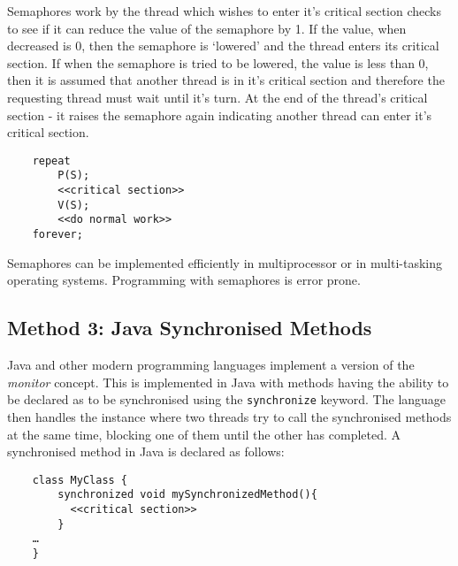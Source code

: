 Semaphores work by the thread which wishes to enter it's critical section checks to see if it can reduce the value of the semaphore by 1. If the value, when decreased is 0, then the semaphore is `lowered' and the thread enters its critical section. If when the semaphore is tried to be lowered, the value is less than 0, then it is assumed that another thread is in it's critical section and therefore the requesting thread must wait until it's turn. At the end of the thread's critical section - it raises the semaphore again indicating another thread can enter it's critical section.
\begin{verbatim}
    repeat
        P(S);
        <<critical section>>
        V(S);
        <<do normal work>>
    forever;
\end{verbatim}
Semaphores can be implemented efficiently in multiprocessor or in multi-tasking operating systems. Programming with semaphores is error prone. 

\subsection{Method 3: Java Synchronised Methods}
Java and other modern programming languages implement a version of the \textit{monitor} concept. This is implemented in Java with methods having the ability to be declared as to be synchronised using the \verb|synchronize| keyword. The language then handles the instance where two threads try to call the synchronised methods at the same time, blocking one of them until the other has completed. A synchronised method in Java is declared as follows:
\begin{verbatim}
    class MyClass {
        synchronized void mySynchronizedMethod(){
	      <<critical section>>
        }
    …
    }

\end{verbatim}
